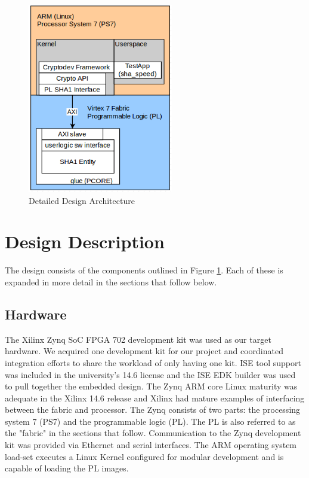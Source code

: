 \documentclass[journal]{IEEEtran}
\begin{document}
\begin{figure}[ht]
\centering
\includegraphics[width=2.5in]{lowleveldesigndiagram.png}
\caption{Detailed Design Architecture}
\label{fig_archBlkDetailed}
\end{figure} 


\section{Design Description}
The design consists of the components outlined in Figure \ref{fig_archBlkDetailed}.  Each of these is expanded in more detail in the sections that follow below.
\subsection{Hardware}
The Xilinx Zynq SoC FPGA 702 development kit was used as our target hardware. We acquired one development kit for our project and coordinated integration efforts to share the workload of only having one kit.  ISE tool support was included in the university's 14.6 license and the ISE EDK builder was used to pull together the embedded design. The Zynq ARM core Linux maturity was adequate in the Xilinx 14.6 release and Xilinx had mature examples of interfacing between the fabric and processor. \cite{XIL2013} \cite{XILGNU2013}   The Zynq consists of two parts: the processing system 7 (PS7) and the programmable logic (PL). The PL is also referred to as the "fabric" in the sections that follow.  Communication to the Zynq development kit was provided via Ethernet and serial interfaces.  The ARM operating system load-set executes a Linux Kernel configured for modular development and is capable of loading the PL images.
\end{document}
